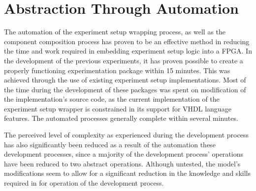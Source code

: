 \documentclass[main.tex]{subfiles}
\begin{document}
\section{Abstraction Through Automation}
The automation of the experiment setup wrapping process, as well as the component composition process has proven to be an effective method in reducing the time and work required in embedding experiment setup logic into a FPGA. In the development of the previous experiments, it has proven possible to create a properly functioning experimentation package within 15 minutes. This was achieved through the use of existing experiment setup implementations. Most of the time during the development of these packages was spent on modification of the implementation's source code, as the current implementation of the experiment setup wrapper is constrained in its support for VHDL language features. The automated processes generally complete within several minutes. 

The perceived level of complexity as experienced during the development process has also significantly been reduced as a result of the automation these development processes, since a majority of the development process' operations have been reduced to two abstract operations. Although untested, the model's modifications seem to allow for a significant reduction in the knowledge and skills required in for operation of the development process.

    
\end{document}
